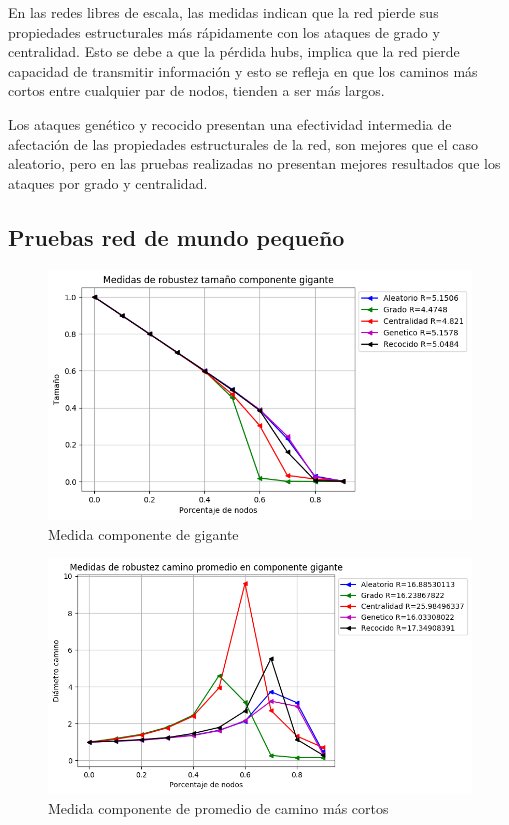 En las redes libres de escala, las medidas indican que la red pierde sus propiedades estructurales más rápidamente con los ataques de grado y centralidad. Esto se debe a que la pérdida hubs, implica que la red pierde capacidad de transmitir información y esto se refleja en que los caminos más cortos entre cualquier par de nodos, tienden a ser más largos.

Los ataques genético y recocido presentan una efectividad intermedia de afectación de las propiedades estructurales de la red, son mejores que el caso aleatorio, pero en las pruebas realizadas no presentan mejores resultados que los ataques por grado y centralidad.

\subsection{Pruebas red de mundo pequeño}

\begin{figure}[H]
    \centering
    \includegraphics[scale=0.7]{Capitulo5Robustez/imagenes/grafica_GC20180510_143549SmallWorld5000NodesRewire01.png}
    \caption{Medida componente de gigante}
    \label{figure:smallWorldGC}
\end{figure}


\begin{figure}[H]
    \centering
    \includegraphics[scale=0.7]{Capitulo5Robustez/imagenes/grafica_APL20180510_143549SmallWorld5000NodesRewire01.png}
    \caption{Medida componente de promedio de camino más cortos}
    \label{figure:smallWorldAPL}
\end{figure}

